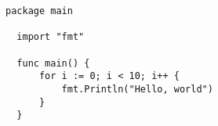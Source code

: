 \documentclass[leqno]{ltjsarticle}%
\begin{document}
\begin{lstlisting}[caption=hoge,label=fuga]
  package main
  
  import "fmt"
  
  func main() {
      for i := 0; i < 10; i++ {
          fmt.Println("Hello, world")
      }
  }
  \end{lstlisting}
\end{document}
